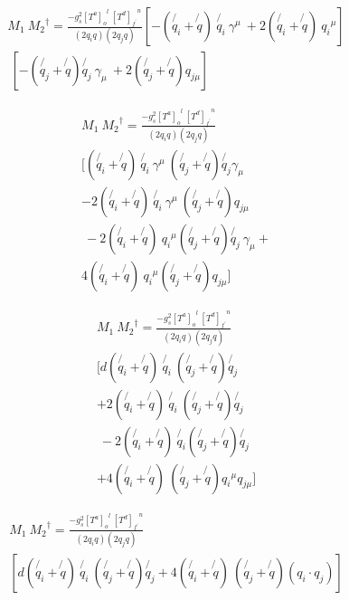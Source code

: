\begin{equation}
\begin{split}
M_1\: {M_2}^{\dagger} = \frac{-g_s^2 {[T^a]_o}^l \:{[T^d]_{f^{\prime}}}^n }{(2q_i q)(2q_j q)} [-(\not{q_i} + \not{q})\:\not{q_i}\: \gamma^{\mu} \:+2(\not{q_i} + \not{q})\:{q_{i}}^{\mu}]\\
\:[-(\not{q_j} + \not{q}) \not{q_j} \:\gamma_{\mu} \: + 2(\not{q_j} + \not{q}) {q_{j{\mu}}}]\:
\end{split}
\end{equation}


\begin{equation}
\begin{split}
M_1\: {M_2}^{\dagger} = \frac{-g_s^2 {[T^a]_o}^l \:{[T^d]_{f^{\prime}}}^n }{(2q_i q)(2q_j q)} \\
[(\not{q_i} + \not{q})\:\not{q_i}\: \gamma^{\mu} \:(\not{q_j} + \not{q}) \not{q_j} \gamma_{\mu} \\
-2(\not{q_i} + \not{q})\:\not{q_i}\: \gamma^{\mu}\: (\not{q_j} + \not{q}) {q_{j{\mu}}}\\
\:-2(\not{q_i} + \not{q})\:{q_{i}}^{\mu}(\not{q_j} + \not{q}) \not{q_j} \:\gamma_{\mu}+\\
4(\not{q_i} + \not{q})\:{q_{i}}^{\mu}(\not{q_j} + \not{q}) {q_{j{\mu}}}]
\end{split}
\end{equation}



\begin{equation}
\begin{split}
M_1\: {M_2}^{\dagger} = \frac{-g_s^2 {[T^a]_o}^l \:{[T^d]_{f^{\prime}}}^n }{(2q_i q)(2q_j q)}\\ 
[d(\not{q_i} + \not{q})\:\not{q_i}\: (\not{q_j} + \not{q}) \not{q_j} \\
+2(\not{q_i} + \not{q})\:\not{q_i}\: (\not{q_j} + \not{q}) \not{q_j}\\
\:-2(\not{q_i} + \not{q})\:\not{q_{i}}(\not{q_j} + \not{q}) \not{q_j} \\
+4(\not{q_i} + \not{q})\:(\not{q_j} + \not{q}) {q_{i}}^{\mu}{q_{j{\mu}}}]
\end{split}
\end{equation}

\begin{equation}
\begin{split}
M_1\: {M_2}^{\dagger} = \frac{-g_s^2 {[T^a]_o}^l \:{[T^d]_{f^{\prime}}}^n }{(2q_i q)(2q_j q)}\\ 
[d(\not{q_i} + \not{q})\:\not{q_i}\: (\not{q_j} + \not{q}) \not{q_j}+4(\not{q_i} + \not{q})\:(\not{q_j} + \not{q}) (q_i \cdot q_j)]
\end{split}
\end{equation}


